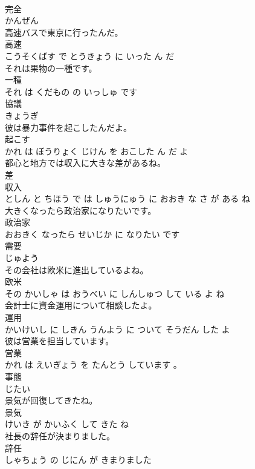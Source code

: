 \documentclass[8pt]{extreport}
\begin{document}
\begin{CJK}{UTF8}{min}
\\	完全	
\\	かんぜん			
\\	高速バスで東京に行ったんだ。	
\\	高速 
\\	こうそくばす で とうきょう に いった ん だ			
\\	それは果物の一種です。	
\\	一種 
\\	それ は くだもの の いっしゅ です			
\\	協議	
\\	きょうぎ			
\\	彼は暴力事件を起こしたんだよ。	
\\	起こす 
\\	かれ は ぼうりょく じけん を おこした ん だ よ			
\\	都心と地方では収入に大きな差があるね。	
\\	差 
\\	収入 
\\	としん と ちほう で は しゅうにゅう に おおき な さ が ある ね			
\\	大きくなったら政治家になりたいです。	
\\	政治家 
\\	おおきく なったら せいじか に なりたい です			
\\	需要	
\\	じゅよう			
\\	その会社は欧米に進出しているよね。	
\\	欧米 
\\	その かいしゃ は おうべい に しんしゅつ して いる よ ね			
\\	会計士に資金運用について相談したよ。	
\\	運用 
\\	かいけいし に しきん うんよう に ついて そうだん した よ			
\\	彼は営業を担当しています。	
\\	営業 
\\	かれ は えいぎょう を たんとう しています 。			
\\	事態	
\\	じたい			
\\	景気が回復してきたね。	
\\	景気 
\\	けいき が かいふく して きた ね			
\\	社長の辞任が決まりました。	
\\	辞任 
\\	しゃちょう の じにん が きまりました			

\end{CJK}
\end{document}
